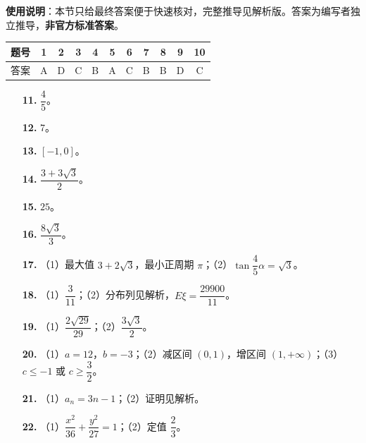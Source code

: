 
\begin{gknotice}
\textbf{使用说明}：本节只给最终答案便于快速核对，完整推导见解析版。答案为编写者独立推导，\textbf{非官方标准答案}。
\end{gknotice}

\begin{center}\begin{tabular}{ccccccccccc}
\toprule
题号 & 1 & 2 & 3 & 4 & 5 & 6 & 7 & 8 & 9 & 10 \\
\midrule
答案 & A & D & C & B & A & C & B & B & D & C \\
\bottomrule
\end{tabular}\end{center}

\begin{itemize}[leftmargin=2.6em]
  \item[\textbf{11.}] $\dfrac45$。
  \item[\textbf{12.}] $7$。
  \item[\textbf{13.}] $[-1,0]$。
  \item[\textbf{14.}] $\dfrac{3+3\sqrt3}2$。
  \item[\textbf{15.}] $25$。
  \item[\textbf{16.}] $\dfrac{8\sqrt3}3$。
\end{itemize}

\begin{itemize}[leftmargin=2.6em]
  \item[\textbf{17.}] （1）最大值 $3+2\sqrt3$，最小正周期 $\pi$；（2）$\tan\dfrac45\alpha=\sqrt3$。
  \item[\textbf{18.}] （1）$\dfrac3{11}$；（2）分布列见解析，$E\xi=\dfrac{29900}{11}$。
  \item[\textbf{19.}] （1）$\dfrac{2\sqrt{29}}{29}$；（2）$\dfrac{3\sqrt3}2$。
  \item[\textbf{20.}] （1）$a=12$，$b=-3$；（2）减区间 $(0,1)$，增区间 $(1,+\infty)$；（3）$c\leqslant-1$ 或 $c\geqslant\dfrac32$。
  \item[\textbf{21.}] （1）$a_n=3n-1$；（2）证明见解析。
  \item[\textbf{22.}] （1）$\dfrac{x^2}{36}+\dfrac{y^2}{27}=1$；（2）定值 $\dfrac23$。
\end{itemize}
